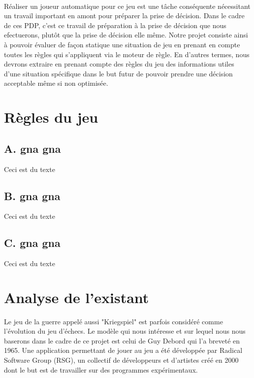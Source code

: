 \documentclass[12pt]{article}
\begin{document}
	\paragraph{}
	Réaliser un joueur automatique pour ce jeu est une tâche conséquente nécessitant un travail important en amont pour préparer la prise de décision.
	Dans le cadre de ces PDP, c'est ce travail de préparation à la prise de décision que nous efectuerons, plutôt que la prise de décision elle même.
	Notre projet consiste ainsi à pouvoir évaluer de façon statique une situation de jeu en prenant en compte toutes les règles qui s'appliquent via le moteur de règle.
	En d'autres termes, nous devrons extraire en prenant compte des règles du jeu des informations utiles d'une situation 
	spécifique dans le but futur de pouvoir prendre une décision acceptable même si non optimisée.
	
	\clearpage
	
	\section{Règles du jeu}    

		\subsection{ A. gna gna}
		
		Ceci est du texte
		
		\subsection{ B. gna gna}
		
		Ceci est du texte
		
		\subsection{ C. gna gna}
		
		Ceci est du texte
		
		\clearpage

	\section{Analyse de l'existant}    

		\paragraph{}
		Le jeu de la guerre appelé aussi "Kriegspiel" est parfois considéré comme l'évolution du jeu d'échecs.
		Le modèle qui nous intéresse et sur lequel nous nous baserons dans le cadre de ce projet est celui de Guy Debord qui l'a breveté en 1965.
		Une application permettant de jouer au jeu a été développée par Radical Software Group (RSG), un collectif de développeurs et d'artistes 
		créé en 2000 dont le but est de travailler sur des programmes expérimentaux.
		
\end{document}
